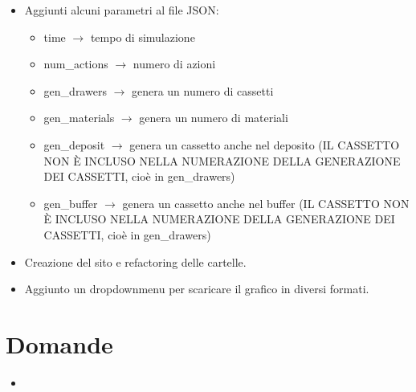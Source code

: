 \documentclass[a4paper]{article}
\begin{document}
\begin{itemize}[label=]
		\item Aggiunti alcuni parametri al file JSON:
		\begin{itemize}
			\item time $\rightarrow$ tempo di simulazione
			\item num\_actions $\rightarrow$ numero di azioni
			\item gen\_drawers $\rightarrow$ genera un numero di cassetti
			\item gen\_materials $\rightarrow$ genera un numero di materiali
			\item gen\_deposit $\rightarrow$ genera un cassetto anche nel deposito (IL CASSETTO NON È INCLUSO NELLA NUMERAZIONE DELLA GENERAZIONE DEI CASSETTI, cioè in gen\_drawers)
			\item gen\_buffer $\rightarrow$ genera un cassetto anche nel buffer (IL CASSETTO NON È INCLUSO NELLA NUMERAZIONE DELLA GENERAZIONE DEI CASSETTI, cioè in gen\_drawers)
		\end{itemize}
		
		\item Creazione del sito e refactoring delle cartelle.
		
		\item Aggiunto un dropdownmenu per scaricare il grafico in diversi formati.
	\end{itemize}
	
	\section*{Domande}
	\begin{itemize}
		\item
	\end{itemize}
\end{document}
